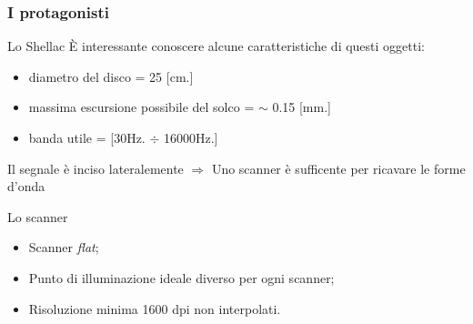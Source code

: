 \begin{frame}

\frametitle{I protagonisti}

\begin{block}{Lo Shellac}
\`E interessante conoscere alcune caratteristiche di questi oggetti:
\begin{itemize}
\item diametro del disco = 25 [cm.]
\item massima escursione possibile del solco = $\sim$ 0.15 [mm.]
\item banda utile = [30Hz. $\div$ 16000Hz.]
\end{itemize}
Il segnale è inciso lateralemente $\Rightarrow$ Uno scanner è 
sufficente per ricavare le forme d'onda
\end{block}

\begin{block}{Lo scanner}
\begin{itemize}
\item Scanner \emph{flat};
\item Punto di illuminazione ideale diverso per ogni scanner;
\item Risoluzione minima 1600 dpi non interpolati.
\end{itemize}
\end{block}

\end{frame}



